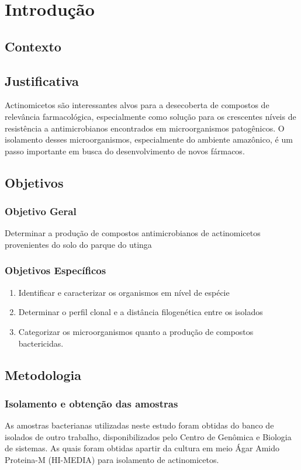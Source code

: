 \chapter{Introdução}
\label{cap:introducao}

\section{Contexto}



\section{Justificativa}
Actinomicetos são interessantes alvos para a desecoberta de compostos
de relevância farmacológica, especialmente como solução para os crescentes níveis
de resistência a antimicrobianos encontrados em microorganismos patogênicos.
O isolamento desses microorganismos, especialmente do ambiente amazônico,
é um passo importante em busca do desenvolvimento de novos fármacos.

\section{Objetivos}

\subsection{Objetivo Geral}

Determinar a produção de compostos antimicrobianos de actinomicetos
provenientes do solo do parque do utinga

\subsection{Objetivos Específicos}
\begin{enumerate}
    \item Identificar e caracterizar os organismos em nível de espécie
    \item Determinar o perfil clonal e a distância filogenética entre os isolados
    \item Categorizar os microorganismos quanto a produção de compostos bactericidas.
\end{enumerate}

\section{Metodologia}
\subsection{Isolamento e obtenção das amostras}
As amostras bacterianas utilizadas neste estudo foram obtidas do banco de isolados de outro
trabalho, disponibilizados pelo Centro de Genômica e Biologia de sistemas. As quais foram
obtidas apartir da cultura em meio Ágar Amido Proteina-M (HI-MEDIA) para isolamento de actinomicetos.

